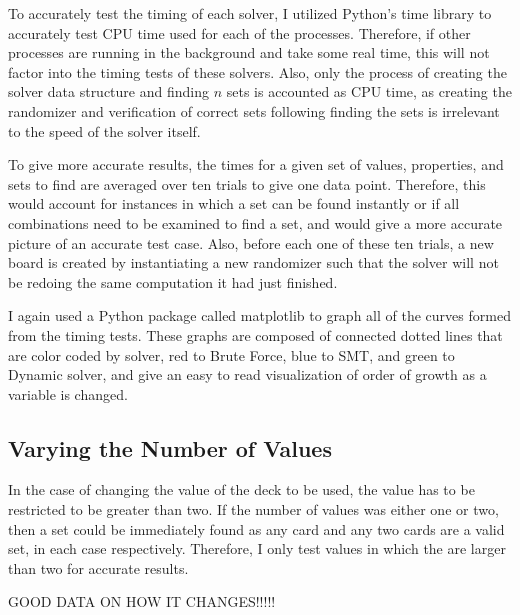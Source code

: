 \documentclass[pageno]{jpaper}
\begin{document}
To accurately test the timing of each solver, I utilized Python's time library to accurately test CPU time used for each of the processes. Therefore, if other processes are running in the background and take some real time, this will not factor into the timing tests of these solvers. Also, only the process of creating the solver data structure and finding $n$ sets is accounted as CPU time, as creating the randomizer and verification of correct sets following finding the sets is irrelevant to the speed of the solver itself. 

To give more accurate results, the times for a given set of values, properties, and sets to find are averaged over ten trials to give one data point. Therefore, this would account for instances in which a set can be found instantly or if all combinations need to be examined to find a set, and would give a more accurate picture of an accurate test case. Also, before each one of these ten trials, a new board is created by instantiating a new randomizer such that the solver will not be redoing the same computation it had just finished. 

I again used a Python package called matplotlib to graph all of the curves formed from the timing tests. These graphs are composed of connected dotted lines that are color coded by solver, red to Brute Force, blue to SMT, and green to Dynamic solver, and give an easy to read visualization of order of growth as a variable is changed. 



\subsection{Varying the Number of Values}

In the case of changing the value of the deck to be used, the value has to be restricted to be greater than two. If the number of values was either one or two, then a set could be immediately found as any card and any two cards are a valid set, in each case respectively. Therefore, I only test values in which the are larger than two for accurate results. 

GOOD DATA ON HOW IT CHANGES!!!!! 
\end{document}
